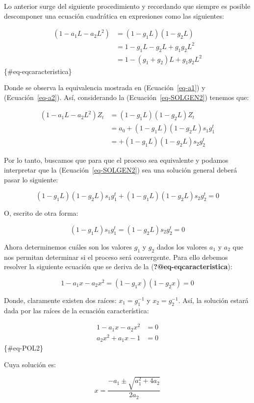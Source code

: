 \documentclass[
  a4paper,
]{article}
\begin{document}
Lo anterior surge del siguiente procedimiento y recordando que siempre
es posible descomponer una ecuación cuadrática en expresiones como las
siguientes:

\begin{align}
(1 - a_1 L - a_2 L^2) & = (1 - g_1 L)(1 - g_2 L) \nonumber \\
& = 1 - g_1 L - g_2 L + g_1 g_2 L^2 \nonumber \\
& = 1 - (g_1 + g_2) L + g_1 g_2 L^2
\end{align} \{\#eq-eqcaracteristica\}

Donde se observa la equivalencia mostrada en (Ecuación~\ref{eq-a1}) y
(Ecuación~\ref{eq-a2}). Así, considerando la (Ecuación~\ref{eq-SOLGEN2})
tenemos que:

\begin{align}
(1 - a_1 L - a_2 L^2) Z_t & = (1 - g_1 L)(1 - g_2 L) Z_t \nonumber \\
& = a_0 + (1 - g_1 L)(1 - g_2 L) s_1 g^t_1 \nonumber \\
& = + (1 - g_1 L)(1 - g_2 L) s_2 g^t_2
\end{align}

Por lo tanto, buscamos que para que el proceso sea equivalente y podamos
interpretar que la (Ecuación~\ref{eq-SOLGEN2}) sea una solución general
deberá pasar lo siguiente:

\[
(1 - g_1 L) (1 - g_2 L) s_1 g^t_1 + (1 - g_1 L) (1 - g_2 L) s_2 g^t_2 = 0
\]

O, escrito de otra forma:

\[
(1 - g_1 L) s_1 g^t_1 = (1 - g_2 L) s_2 g^t_2 = 0
\]

Ahora determinemos cuáles son los valores \(g_1\) y \(g_2\) dados los
valores \(a_1\) y \(a_2\) que nos permitan determinar si el proceso será
convergente. Para ello debemos resolver la siguiente ecuación que se
deriva de la (\textbf{?@eq-eqcaracteristica}):

\[
1 - a_1 x - a_2 x^2 = (1 - g_1 x)(1 - g_2 x) = 0
\]

Donde, claramente existen dos raíces: \(x_1 = g^{-1}_1\) y
\(x_2 = g^{-1}_2\). Así, la solución estará dada por las raíces de la
ecuación característica:

\begin{align}
1 - a_1 x - a_2 x^2 & = 0 \nonumber \\
a_2 x^2 + a_1 x - 1 & = 0
\end{align} \{\#eq-POL2\}

Cuya solución es:

\[
x = \frac{- a_1 \pm \sqrt{a^2_1 + 4 a_2}}{2 a_2}
\]
\end{document}
